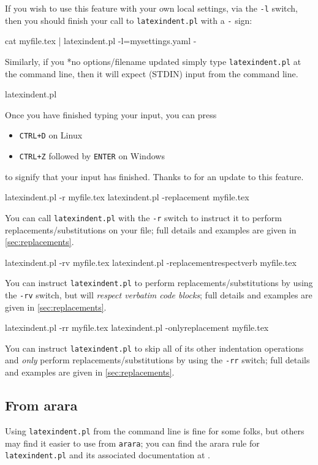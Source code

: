 	If you wish to use this feature with your own local settings, via the
	\texttt{-l} switch, then you should finish your call to
	\texttt{latexindent.pl} with a \texttt{-} sign:
	\begin{commandshell}
cat myfile.tex | latexindent.pl -l=mysettings.yaml -
\end{commandshell}

	Similarly, if you%
	*{no options/filename updated} simply type
	\texttt{latexindent.pl} at the command line, then it will expect (STDIN) input from the
	command line.
	\begin{commandshell}
latexindent.pl
\end{commandshell}

	Once you have finished typing your input, you can press
	\begin{itemize}
		\item \texttt{CTRL+D} on Linux
		\item \texttt{CTRL+Z} followed by \texttt{ENTER} on Windows
	\end{itemize}
	to signify that your input has finished. Thanks to \cite{xu-cheng} for an update
	to this feature.
	\begin{commandshell}
latexindent.pl -r myfile.tex
latexindent.pl -replacement myfile.tex
\end{commandshell}
	You can%
	 call
	\texttt{latexindent.pl} with the \texttt{-r} switch to instruct it to perform
	replacements/substitutions on your file; full details and examples are given in
	\vref{sec:replacements}.

	\begin{commandshell}
latexindent.pl -rv myfile.tex
latexindent.pl -replacementrespectverb myfile.tex
\end{commandshell}
	You can%
	 instruct
	\texttt{latexindent.pl} to perform replacements/substitutions by using the
	\texttt{-rv} switch, but will \emph{respect verbatim code blocks}; full details and
	examples are given in \vref{sec:replacements}.

	\begin{commandshell}
latexindent.pl -rr myfile.tex
latexindent.pl -onlyreplacement myfile.tex
\end{commandshell}
	You can%
	 instruct
	\texttt{latexindent.pl} to skip all of its other indentation operations and
	\emph{only} perform replacements/substitutions by using the
	\texttt{-rr} switch; full details and examples are given in
	\vref{sec:replacements}.

\subsection{From arara}\label{sec:arara}
	Using \texttt{latexindent.pl} from the command line is fine for some folks, but others
	may find it easier to use from \texttt{arara}; you can find the arara rule for
	\texttt{latexindent.pl} and its associated documentation at \cite{paulo}.
